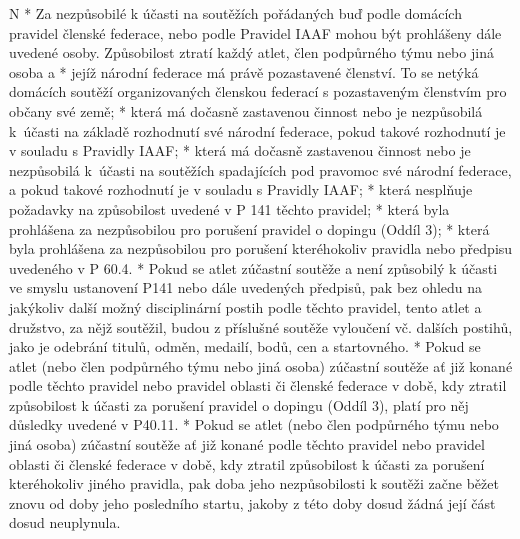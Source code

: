 \begitems \style N
* Za nezpůsobilé k účasti na soutěžích pořádaných buď podle domácích pravidel členské federace, nebo podle Pravidel IAAF mohou být prohlášeny dále uvedené osoby.
Způsobilost ztratí každý atlet, člen podpůrného týmu nebo jiná osoba
  \begitems \style a
  * jejíž národní federace má právě pozastavené členství. To se netýká domácích soutěží organizovaných členskou federací s pozastaveným členstvím pro občany své země;
  * která má dočasně zastavenou činnost nebo je nezpůsobilá k~účasti na základě rozhodnutí své národní federace, pokud takové rozhodnutí je v souladu s Pravidly IAAF;
  * která má dočasně zastavenou činnost nebo je nezpůsobilá k~účasti na soutěžích spadajících pod pravomoc své národní federace, a pokud takové rozhodnutí je v souladu s Pravidly IAAF;
  * která nesplňuje požadavky na způsobilost uvedené v P 141 těchto pravidel;
  * která byla prohlášena za nezpůsobilou pro porušení pravidel o dopingu (Oddíl 3);
  * která byla prohlášena za nezpůsobilou pro porušení kteréhokoliv pravidla nebo předpisu uvedeného v P 60.4.
  \enditems
* Pokud se atlet zúčastní soutěže a není způsobilý k účasti ve smyslu ustanovení P141 nebo dále uvedených předpisů, pak bez ohledu na jakýkoliv další možný disciplinární postih podle těchto pravidel, tento atlet a družstvo, za nějž soutěžil, budou z příslušné soutěže vyloučení vč. dalších postihů, jako je odebrání titulů, odměn, medailí, bodů, cen a startovného.
* Pokud se atlet (nebo člen podpůrného týmu nebo jiná osoba) zúčastní soutěže ať již konané podle těchto pravidel nebo pravidel oblasti či členské federace v době, kdy ztratil způsobilost k účasti za porušení pravidel o dopingu (Oddíl 3), platí pro něj důsledky uvedené v P40.11.
* Pokud se atlet (nebo člen podpůrného týmu nebo jiná osoba) zúčastní soutěže ať již konané podle těchto pravidel nebo pravidel oblasti či členské federace v době, kdy ztratil způsobilost k účasti za porušení kteréhokoliv jiného pravidla, pak doba jeho nezpůsobilosti k soutěži začne běžet znovu od doby jeho posledního startu, jakoby z této doby dosud žádná její část dosud neuplynula.
\enditems

\endinput